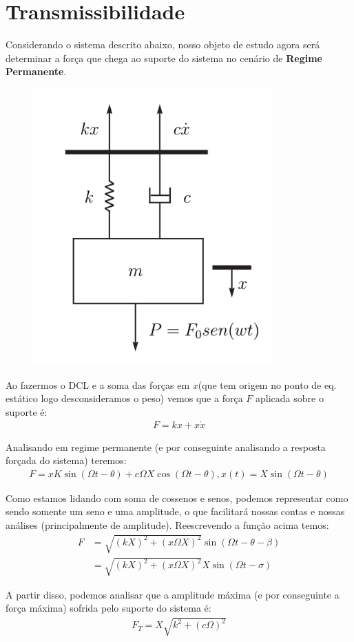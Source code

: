\documentclass{article}
\newcommand{\n}{\nonumber \\ }
\begin{document}
        \section{Transmissibilidade}
            Considerando o sistema descrito abaixo, nosso objeto de estudo agora será determinar a força que chega ao suporte do sistema no cenário de \textbf{Regime Permanente}.
            \begin{figure}[h]
                \centering
                \includegraphics[width=.3\textwidth]{imgs/trans.png}
            \end{figure}

            Ao fazermos o DCL e  a soma das forças em $x$(que tem origem no ponto de eq. estático logo desconsideramos o peso) vemos que a força $F$ aplicada sobre o suporte é:
            \begin{align}
                F = kx + x\dot x
            \end{align}

            Analisando em regime permanente (e por conseguinte analisando a resposta forçada do sistema) teremos:
            \begin{align}
                F = xK\sin(\Omega t - \theta) + c \Omega X \cos(\Omega t - \theta) ,   x(t) = X\sin(\Omega t -\theta)
            \end{align}

            Como estamos lidando com soma de cossenos e senos, podemos representar como sendo somente um seno e uma amplitude, o que facilitará nossas contas e nossas análises (principalmente de
            amplitude). Reescrevendo a função acima temos:
            \begin{align}
                F &= \sqrt{(kX)^2 + (x\Omega X)^2} \sin(\Omega t - \theta - \beta) \n
                  &= \sqrt{(kX)^2 + (x\Omega X)^2}  X \sin(\Omega t - \sigma)
            \end{align}

            A partir disso, podemos analisar que a amplitude máxima (e por conseguinte a força máxima) sofrida pelo suporte do sistema é:
            \begin{align}
                F_T = X\sqrt{k^2 + (c \Omega)^2}
            \end{align}
\end{document}
